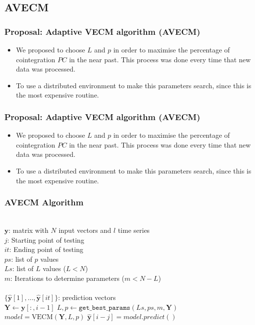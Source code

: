 \documentclass[compress,red]{beamer}
\begin{document}
\subsection{AVECM}
\begin{frame}
\frametitle{Proposal: Adaptive VECM algorithm (AVECM)}
\begin{itemize}
\item We proposed to choose $L$ and $p$ in order to maximise the percentage of
cointegration $PC$ in the near past. This process was done every time that new data was processed. 
\item To use a distributed environment to make this parameters search, since this is the most expensive routine.
\end{itemize}
\end{frame}


\begin{frame}
\frametitle{Proposal: Adaptive VECM algorithm (AVECM)}
\begin{itemize}
\item We proposed to choose $L$ and $p$ in order to maximise the percentage of
cointegration $PC$ in the near past. This process was done every time that new data was processed. 
\item To use a distributed environment to make this parameters search, since this is the most expensive routine.
\end{itemize}
\end{frame}


\begin{frame}
\frametitle{AVECM Algorithm}
\begin{algorithmic}[1]
\REQUIRE $\,$ \\
$\mathbf{y}$: matrix with $N$ input vectors and $l$ time series\\
$j$: Starting point of testing \\
$it$: Ending point of testing \\
$ps$: list of $p$ values \\
$Ls$: list of $L$ values ($L<N$) \\
$m$: Iterations to determine parameters ($m < N-L$)\\
\ENSURE  $\,$ \\
$\{ \hat{\mathbf{y}}[1],\dots,\hat{\mathbf{y}}[it]\}$: prediction vectors \\
   \STATE $\mathbf{Y} \gets \mathbf{y}[:,i-1]$
    \STATE $L,p \gets
    \texttt{get\_best\_params}(Ls,ps,m,\mathbf{Y})$
        \STATE $model = \text{VECM}(\mathbf{Y},L, p)$
        \STATE $\hat{\mathbf{y}}[i-j] = model.predict()$
\ENDFOR
\end{algorithmic}
\end{frame}
\end{document}
